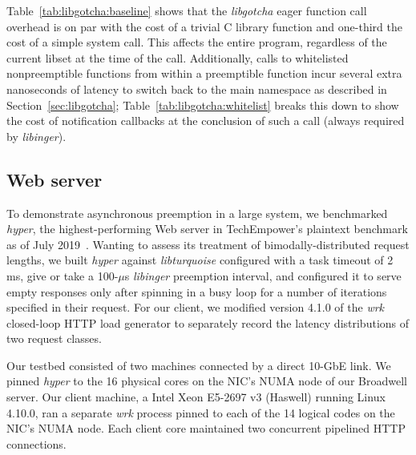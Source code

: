 Table~\ref{tab:libgotcha:baseline} shows that the \textit{libgotcha} eager function
call overhead is on par with the cost of a trivial C library function and one-third
the cost of a simple system call.  This affects the entire program, regardless of the
current libset at the time of the call.  Additionally, calls to whitelisted
nonpreemptible functions from within a preemptible function incur several extra
nanoseconds of latency to switch back to the main namespace as described in
Section~\ref{sec:libgotcha}; Table~\ref{tab:libgotcha:whitelist} breaks this down to
show the cost of notification callbacks at the conclusion of such a call (always
required by \textit{libinger}).


\subsection{Web server}

To demonstrate asynchronous preemption in a large system, we benchmarked
\textit{hyper}, the highest-performing Web server in TechEmpower's plaintext
benchmark as of July 2019~\cite{www-hyper}.  Wanting to assess its treatment of
bimodally-distributed request lengths, we built \textit{hyper} against
\textit{libturquoise} configured with a task timeout of 2 ms, give or take a
100-$\mu$s \textit{libinger} preemption interval, and configured it to serve empty
responses only after spinning in a busy loop for a number of iterations specified in
their request.  For our client, we modified version 4.1.0 of the
\textit{wrk}~\cite{www-wrk} closed-loop HTTP load generator to separately record the
latency distributions of two request classes.

Our testbed consisted of two machines connected by a direct 10-GbE link.  We pinned
\textit{hyper} to the 16 physical cores on the NIC's NUMA node of our Broadwell
server.  Our client machine, a Intel Xeon E5-2697 v3 (Haswell) running Linux 4.10.0,
ran a separate \textit{wrk} process pinned to each of the 14 logical codes on the
NIC's NUMA node.  Each client core maintained two concurrent pipelined HTTP
connections.

